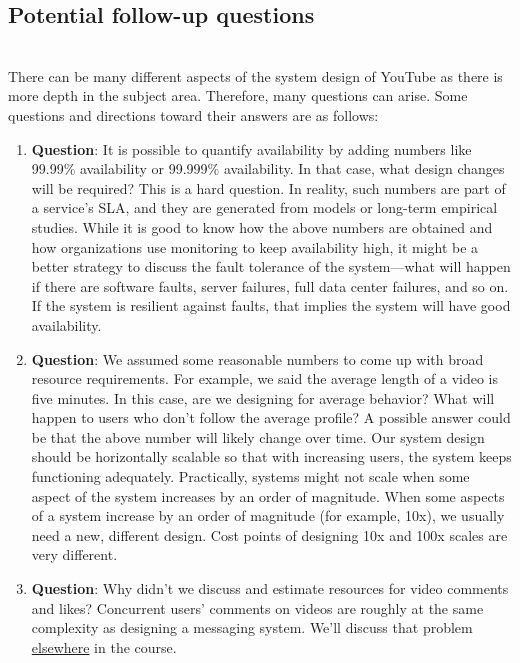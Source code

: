 \subsection{Potential follow-up questions}\label{Kkp5xl3cyt5jnY_yXnDEc}
\\
There can be many different aspects of the system design of YouTube as there is more depth in the subject area. Therefore, many questions can arise. Some questions and directions toward their answers are as follows:

\begin{enumerate}
\item
\protect{}\label{L7Ys7IjzfcZR_jIn9TqCl}
\textbf{Question}: It is possible to quantify availability by adding numbers like 99.99\% availability or 99.999\% availability. In that case, what design changes will be required? This is a hard question. In reality, such numbers are part of a service's SLA, and they are generated from models or long-term empirical studies. While it is good to know how the above numbers are obtained and how organizations use monitoring to keep availability high, it might be a better strategy to discuss the fault tolerance of the system---what will happen if there are software faults, server failures, full data center failures, and so on. If the system is resilient against faults, that implies the system will have good availability.
\item
\protect{}\label{it8t2MJOyHH_UE5W7-fyS}
\textbf{Question}: We assumed some reasonable numbers to come up with broad resource requirements. For example, we said the average length of a video is five minutes. In this case, are we designing for average behavior? What will happen to users who don't follow the average profile? A possible answer could be that the above number will likely change over time. Our system design should be horizontally scalable so that with increasing users, the system keeps functioning adequately. Practically, systems might not scale when some aspect of the system increases by an order of magnitude. When some aspects of a system increase by an order of magnitude (for example, 10x), we usually need a new, different design. Cost points of designing 10x and 100x scales are very different.
\item
\protect{}\label{OWeDKEOsCXolb19RocrO5}
\textbf{Question}: Why didn't we discuss and estimate resources for video comments and likes? Concurrent users' comments on videos are roughly at the same complexity as designing a messaging system. We'll discuss that problem \href{https://www.educative.io/courses/grokking-the-system-design-interview/system-design-whatsapp}{elsewhere} in the course.

\end{enumerate}
